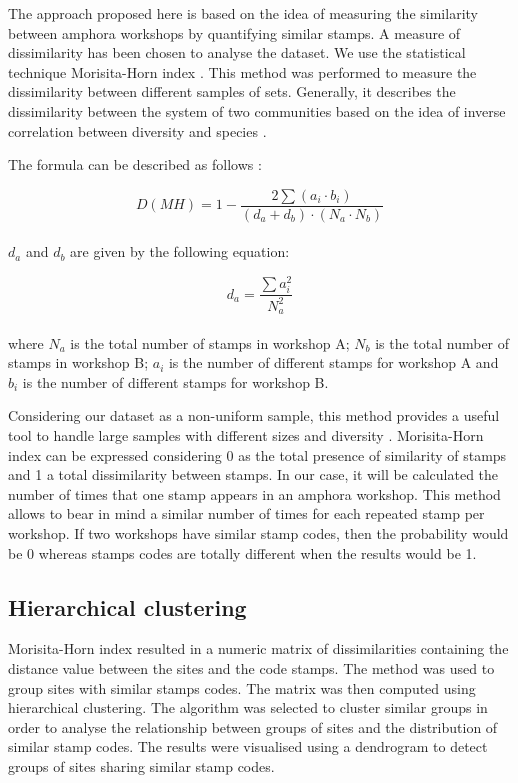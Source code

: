 \documentclass[review]{elsarticle}
\begin{document}
The approach proposed here is based on the idea of measuring the similarity between amphora workshops by quantifying similar stamps. A measure of dissimilarity has been chosen to analyse the dataset. We use the statistical technique Morisita-Horn index \citep{morisita_measuring_1959, horn_measurement_1966}. This method was performed to measure the dissimilarity between different samples of sets. Generally, it describes the dissimilarity between the system of two communities based on the idea of inverse correlation between diversity and species \citep{magurran_why_1988}.

The formula can be described as follows \citep{magurran_measuring_2013}:

\begin{equation}
D(MH) = 1- \frac{2 \sum(a_{i} \cdot b_{i})}{(d_{a} + d_{b}) \cdot (N_{a} \cdot N_{b})}
\end{equation} \\

$d_{a}$ and $d_{b}$ are given by the following equation:

\begin{equation}
d_{a} = \frac{\sum a_{i}^{2}}{N_{a}^{2}} 
\end{equation} \\

where $N_{a}$ is the total number of stamps in workshop A; $N_{b}$ is the total number of stamps in workshop B; $a_{i}$ is the number of different stamps for workshop A and $b_{i}$ is the number of different stamps for workshop B.

Considering our dataset as a non-uniform sample, this method provides a useful tool to handle large samples with different sizes and diversity \citep{wolda_similarity_1981}. Morisita-Horn index can be expressed considering 0 as the total presence of similarity of stamps and 1 a total dissimilarity between stamps. In our case, it will be calculated the number of times that one stamp appears in an amphora workshop. This method allows to bear in mind a similar number of times for each repeated stamp per workshop. If two workshops have similar stamp codes, then the probability would be 0 whereas stamps codes are totally different when the results would be 1. 

\subsection{Hierarchical clustering}

Morisita-Horn index resulted in a numeric matrix of dissimilarities containing the distance value between the sites and the code stamps. The method was used to group sites with similar stamps codes. The matrix was then computed using hierarchical clustering. The algorithm was selected to cluster similar groups in order to analyse the relationship between groups of sites and the distribution of similar stamp codes. The results were visualised using a dendrogram to detect groups of sites sharing similar stamp codes.  
\end{document}
